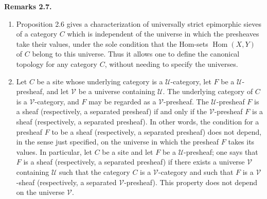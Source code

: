 \documentclass[11pt]{article}
\newcommand{\U}{\mathcal{U}}
\newcommand{\V}{\mathcal{V}}
\newcommand{\Hom}{\operatorname{Hom}}
\newenvironment{remarktext}[1]{\par\medskip\noindent\textbf{#1.}\ }{\par\medskip}
\begin{document}
\begin{remarktext}{Remarks 2.7}
\begin{enumerate}[label=\arabic*)]
\item Proposition 2.6 gives a characterization of universally strict epimorphic sieves of a category \(C\) which is independent of the universe in which the presheaves take their values, under the sole condition that the Hom-sets \(\Hom(X,Y)\) of \(C\) belong to this universe. Thus it allows one to define the canonical topology for any category \(C\), without needing to specify the universes.

\item Let \(C\) be a site whose underlying category is a \(\U\)-category, let \(F\) be a \(\U\)-presheaf, and let \(\V\) be a universe containing \(\U\). The underlying category of \(C\) is a \(\V\)-category, and \(F\) may be regarded as a \(\V\)-presheaf. The \(\U\)-presheaf \(F\) is a sheaf (respectively, a separated presheaf) if and only if the \(\V\)-presheaf \(F\) is a sheaf (respectively, a separated presheaf). In other words, the condition for a presheaf \(F\) to be a sheaf (respectively, a separated presheaf) does not depend, in the sense just specified, on the universe in which the presheaf \(F\) takes its values. In particular, let \(C\) be a site and let \(F\) be a \(\U\)-presheaf; one says that \(F\) is a sheaf (respectively, a separated presheaf) if there exists a universe \(\V\) containing \(\U\) such that the category \(C\) is a \(\V\)-category and such that \(F\) is a \(\V\)-sheaf (respectively, a separated \(\V\)-presheaf). This property does not depend on the universe \(\V\).
\end{enumerate}
\end{remarktext}
\end{document}
